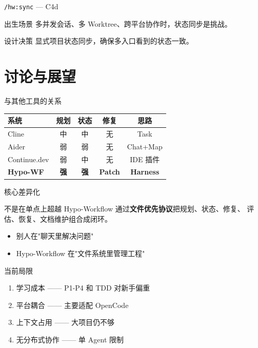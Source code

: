 \documentclass[theme=workflow,aspectratio=169,fontset=tech]{Hypo-Slide}
\begin{document}
\begin{frame}{\texttt{/hw:sync} — C4d}
  \begin{block}{出生场景}
    多并发会话、多 Worktree、跨平台协作时，状态同步是挑战。
  \end{block}
  \begin{block}{设计决策}
    显式项目状态同步，确保多入口看到的状态一致。
  \end{block}
\end{frame}


\section{讨论与展望}

\begin{frame}{与其他工具的关系}
  \centering
  \begin{tabularx}{0.9\textwidth}{lcccc}
    \toprule
    系统 & 规划 & 状态 & 修复 & 思路 \\
    \midrule
    Cline & 中 & 中 & 无 & Task \\
    Aider & 弱 & 弱 & 无 & Chat+Map \\
    Continue.dev & 弱 & 中 & 无 & IDE 插件 \\
    \textbf{Hypo-WF} & \textbf{强} & \textbf{强} & \textbf{Patch} & \textbf{Harness} \\
    \bottomrule
  \end{tabularx}
\end{frame}

\begin{frame}{核心差异化}
  \begin{block}{不是在单点上超越}
    Hypo-Workflow 通过\textbf{文件优先协议}把规划、状态、修复、
    评估、恢复、文档维护组合成闭环。
  \end{block}
  \begin{itemize}
    \item 别人在"聊天里解决问题"
    \item Hypo-Workflow 在"文件系统里管理工程"
  \end{itemize}
\end{frame}

\begin{frame}{当前局限}
  \begin{enumerate}
    \item 学习成本 —— P1-P4 和 TDD 对新手偏重
    \item 平台耦合 —— 主要适配 OpenCode
    \item 上下文占用 —— 大项目仍不够
    \item 无分布式协作 —— 单 Agent 限制
  \end{enumerate}
\end{frame}
\end{document}
